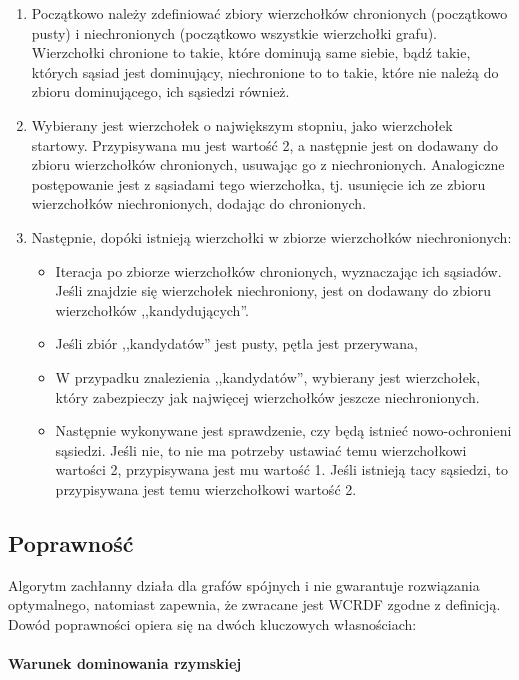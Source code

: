    \begin{enumerate}
        \item Początkowo należy zdefiniować zbiory wierzchołków chronionych (początkowo pusty) i niechronionych (początkowo wszystkie wierzchołki grafu). Wierzchołki chronione to takie, które dominują same siebie, bądź takie, których sąsiad jest dominujący, niechronione to to takie, które nie należą do zbioru dominującego, ich sąsiedzi również.
        \item Wybierany jest wierzchołek o największym stopniu, jako wierzchołek startowy. Przypisywana mu jest wartość 2, a następnie jest on dodawany do zbioru wierzchołków chronionych, usuwając go z niechronionych. Analogiczne postępowanie jest z sąsiadami tego wierzchołka, tj. usunięcie ich ze zbioru wierzchołków niechronionych, dodając do chronionych. 
        \item Następnie, dopóki istnieją wierzchołki w zbiorze wierzchołków niechronionych:
        \begin{itemize}
            \item Iteracja po zbiorze wierzchołków chronionych, wyznaczając ich sąsiadów. Jeśli znajdzie się wierzchołek niechroniony, jest on dodawany do zbioru wierzchołków ,,kandydujących''.
            \item Jeśli zbiór ,,kandydatów'' jest pusty, pętla jest przerywana,
            \item W przypadku znalezienia ,,kandydatów'', wybierany jest wierzchołek, który zabezpieczy jak najwięcej wierzchołków jeszcze niechronionych.
            \item Następnie wykonywane jest sprawdzenie, czy będą istnieć nowo-ochronieni sąsiedzi. Jeśli nie, to nie ma potrzeby ustawiać temu wierzchołkowi wartości 2, przypisywana jest mu wartość 1. Jeśli istnieją tacy sąsiedzi, to przypisywana jest temu wierzchołkowi wartość 2. 
        \end{itemize}
    \end{enumerate}

    \subsection{Poprawność}

    Algorytm zachłanny działa dla grafów spójnych i nie gwarantuje rozwiązania optymalnego, natomiast zapewnia, że zwracane jest WCRDF zgodne z definicją. Dowód poprawności opiera się na dwóch kluczowych własnościach:

    \paragraph{Warunek dominowania rzymskiej}

